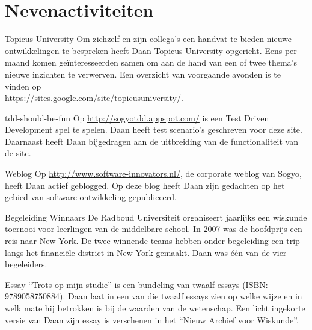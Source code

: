 \section*{Nevenactiviteiten}

	\begin{subActivityList}
		\item[Topicus University] Om zichzelf en zijn collega's een handvat te
		bieden nieuwe ontwikkelingen te bespreken heeft Daan Topicus University
		opgericht. Eens per maand komen ge\"interesseerden samen om aan de hand
		van een of twee thema's nieuwe inzichten te verwerven. Een overzicht
		van voorgaande avonden is te vinden op\\
		\url{https://sites.google.com/site/topicusuniversity/}.\hfill\\
	
		\item[tdd-should-be-fun] Op \url{http://sogyotdd.appspot.com/} is een
		Test Driven Development spel te spelen. Daan heeft test scenario's
		geschreven voor deze site. Daarnaast heeft Daan bijgedragen aan de
		uitbreiding van de functionaliteit van de site.\hfill\\
	
		\item[Weblog] Op \url{http://www.software-innovators.nl/}, de corporate
		weblog van Sogyo, heeft Daan actief geblogged. Op deze blog heeft
		Daan zijn gedachten op het gebied van software ontwikkeling gepubliceerd.
		\hfill\\
		
		\item[Begeleiding Winnaars] De Radboud Universiteit organiseert
		jaarlijks een wiskunde toernooi voor leerlingen van de middelbare
		school. In 2007 was de hoofdprijs een reis naar New York. De twee
		winnende teams hebben onder begeleiding een trip langs het financi\"ele
		district in New York gemaakt. Daan was \'e\'en van de vier begeleiders.
		\hfill\\
		
		\item[Essay] ``Trots op mijn studie'' is een bundeling van twaalf essays
		(ISBN: 9789058750884). Daan laat in een van die twaalf essays zien op
		welke wijze en in welk mate hij betrokken is bij de waarden van de
		wetenschap.
		Een licht ingekorte versie van Daan zijn essay is verschenen in het
		``Nieuw Archief voor Wiskunde''.		
		\hfill\\
	\end{subActivityList}

